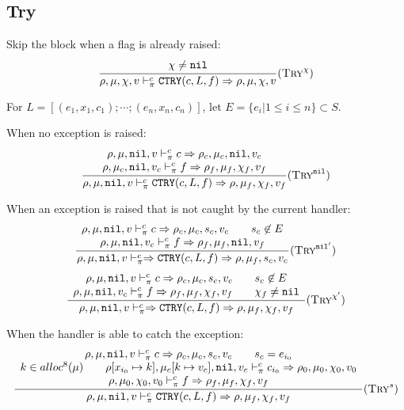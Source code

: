 \subsection{Try}

Skip the block when a flag is already raised:
\[\dfrac{\begin{array}{c}
    \chi\ne\texttt{nil}
\end{array}}{\rho,\mu,\chi,v \vdash_\pi^c \texttt{CTRY}(c, L, f) \Rightarrow \rho,\mu,\chi,v} (\textsc{Try}^\chi)\]

For \(L = [(e_1, x_1, c_1); \cdots; (e_n, x_n, c_n)]\), let \(E = \{ e_i | 1 \leq i \leq n \} \subset S\).

When no exception is raised:
\[\dfrac{\begin{array}{c}
    \rho,\mu,\texttt{nil},v \vdash_\pi^c c \Rightarrow \rho_c,\mu_c,\texttt{nil},v_c \\
    \rho,\mu_c,\texttt{nil},v_c \vdash_\pi^c f \Rightarrow \rho_f,\mu_f,\chi_f,v_f
\end{array}}{\rho,\mu,\texttt{nil},v \vdash_\pi^c \texttt{CTRY}(c, L, f) \Rightarrow \rho,\mu_f,\chi_f,v_f} (\textsc{Try}^{\texttt{nil}})\]

When an exception is raised that is not caught by the current handler:
\[\dfrac{\begin{array}{c}
    \rho,\mu,\texttt{nil},v \vdash_\pi^c c \Rightarrow \rho_c,\mu_c,s_c,v_c \qquad s_c \not\in E \\
    \rho,\mu,\texttt{nil},v_c \vdash_\pi^c f \Rightarrow \rho_f,\mu_f,\texttt{nil},v_f
\end{array}}{\rho,\mu,\texttt{nil},v \vdash_\pi^c \Rightarrow \texttt{CTRY}(c, L, f) \Rightarrow \rho,\mu_f,s_c,v_c} (\textsc{Try}^{\texttt{nil}'})\]
\[\dfrac{\begin{array}{c}
    \rho,\mu,\texttt{nil},v \vdash_\pi^c c \Rightarrow \rho_c,\mu_c,s_c,v_c \qquad s_c \not\in E \\
    \rho,\mu,\texttt{nil},v_c \vdash_\pi^c f \Rightarrow \rho_f,\mu_f,\chi_f,v_f \qquad \chi_f\ne\texttt{nil}
\end{array}}{\rho,\mu,\texttt{nil},v \vdash_\pi^c \Rightarrow \texttt{CTRY}(c, L, f) \Rightarrow \rho,\mu_f,\chi_f,v_f} (\textsc{Try}^{\chi'})\]

When the handler is able to catch the exception:
\[\dfrac{\begin{array}{c}
    \rho,\mu,\texttt{nil},v \vdash_\pi^c c \Rightarrow \rho_c,\mu_c,s_c,v_c \qquad s_c = e_{i_0} \\
    k\in alloc^8(\mu) \qquad \rho[x_{i_0}\mapsto k],\mu_c[k\mapsto v_c],\texttt{nil},v_c \vdash_\pi^c c_{i_0} \Rightarrow \rho_0,\mu_0,\chi_0,v_0 \\
    \rho,\mu_0,\chi_0,v_0 \vdash_\pi^c f \Rightarrow \rho_f,\mu_f,\chi_f,v_f
\end{array}}{\rho,\mu,\texttt{nil},v \vdash_\pi^c \texttt{CTRY}(c, L, f) \Rightarrow \rho,\mu_f,\chi_f,v_f} (\textsc{Try}^s)\]


